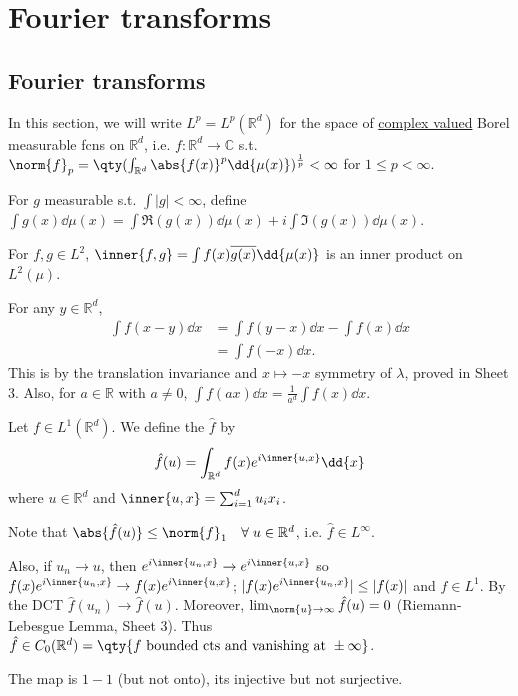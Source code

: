 \section{Fourier transforms}
\subsection{Fourier transforms}
In this section, we will write $L^p = L^p(\mathbb R^d)$ for the space of \underline{complex valued} Borel measurable fcns on $\mathbb{R}^d$, i.e. $f \colon \mathbb R^d \to \mathbb C$ s.t. $\norm{f}_p = \qty(\int_{\mathbb R^d} \abs{f(x)}^p \dd{\mu(x)})^{\frac 1p} < \infty$ for $1 \leq p < \infty$.

\begin{remark}
	For $g$ measurable s.t. $\int |g| < \infty$, define $\int g(x) \dd{\mu(x)} = \int \Re(g(x)) \dd{\mu(x)} + i \int \Im(g(x)) \dd{\mu(x)}$.

\end{remark}

For $f, g \in L^2$, $\inner{f, g} = \int f(x) \overline{g(x)} \dd{\mu(x)}$ is an inner product on $L^2(\mu)$.

For any $y \in \mathbb{R}^d$,
\begin{align*}
	\int f(x - y) \dd{x} &= \int f(y - x) \dd{x} - \int f(x) \dd{x} \\
	&= \int f(-x) \dd{x}.
\end{align*}
This is by the translation invariance and $x \mapsto -x$ symmetry of $\lambda$, proved in Sheet 3.
Also, for $a \in \mathbb{R}$ with $a \neq 0$, $\int f(ax) \dd{x} = \frac{1}{a^d} \int f(x) \dd{x}$.

\begin{definition}
	Let $f \in L^1(\mathbb R^d)$.
	We define the  $\hat f$ by
	\[ \hat f(u) = \int_{\mathbb R^d} f(x) e^{i\inner{u,x}} \dd{x} \]
	where $u \in \mathbb{R}^d$ and $\inner{u,x} = \sum_{i=1}^d u_i x_i$.
\end{definition}

\begin{remark}
	Note that $\abs{\hat f(u)} \leq \norm{f}_1 \quad \forall \; u \in \mathbb{R}^d$, i.e. $\hat{f} \in L^\infty$.

	Also, if $u_n \to u$, then $e^{i\inner{u_n,x}} \to e^{i\inner{u,x}}$ so $f(x) e^{i\inner{u_n,x}} \to f(x) e^{i\inner{u,x}}$; $|f(x) e^{i\inner{u_n,x}}| \leq |f(x)|$ and $f \in L^1$.
	By the DCT $\hat f(u_n) \to \hat f(u)$.
	Moreover, $\lim_{\norm{u} \to \infty} \hat{f}(u) = 0$ (Riemann-Lebesgue Lemma, Sheet 3).
	Thus $\hat f \in C_0(\mathbb{R}^d) = \qty{f \text{ bounded cts and vanishing at } \pm \infty}$.

	The map is $1 - 1$ (but not onto), its injective but not surjective.
\end{remark}

